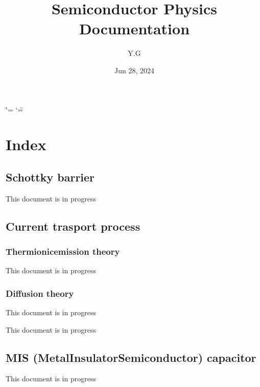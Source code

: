 \documentclass[a4paper,10pt,english]{sphinxmanual}
\title{Semiconductor Physics Documentation}
\date{Jun 28, 2024}
\author{Y.G}
\begin{document}
\ifdefined\shorthandoff
  \ifnum\catcode`\=\string=\active\shorthandoff{=}\fi
  \ifnum\catcode`\"=\active{}\fi
\fi

\pagestyle{empty}
\sphinxmaketitle
\pagestyle{plain}
\sphinxtableofcontents
\pagestyle{normal}
\label{\detokenize{index::doc}}



\chapter{Index}
\label{\detokenize{index:index}}
\sphinxstepscope


\section{Schottky barrier}
\label{\detokenize{Schottky_barrier:schottky-barrier}}\label{\detokenize{Schottky_barrier::doc}}
\sphinxAtStartPar
This document is in progress

\sphinxstepscope


\section{Current trasport process}
\label{\detokenize{Current_trasport:current-trasport-process}}\label{\detokenize{Current_trasport::doc}}
\sphinxstepscope


\subsection{Thermionic\sphinxhyphen{}emission theory}
\label{\detokenize{Thermionic_emission:thermionic-emission-theory}}\label{\detokenize{Thermionic_emission::doc}}
\sphinxAtStartPar
This document is in progress

\sphinxstepscope


\subsection{Diffusion theory}
\label{\detokenize{Diffusion:diffusion-theory}}\label{\detokenize{Diffusion::doc}}
\sphinxAtStartPar
This document is in progress

\sphinxAtStartPar
This document is in progress

\sphinxstepscope


\section{MIS (Metal\sphinxhyphen{}Insulator\sphinxhyphen{}Semiconductor) capacitor}
\label{\detokenize{MIS_capacitor:mis-metal-insulator-semiconductor-capacitor}}\label{\detokenize{MIS_capacitor::doc}}
\sphinxAtStartPar
This document is in progress
\end{document}
